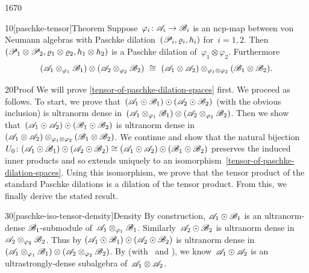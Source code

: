 \begin{parsec}{1670}%
\begin{point}{10}[paschke-tensor]{Theorem}%
Suppose~$\varphi_i \colon \mathscr{A}_i \to \mathscr{B}_i$
    is an ncp-map between von Neumann algebras
    with Paschke dilation~$(\mathscr{P}_i, \varrho_i, h_i)$
    for~$i=1,2$.
Then~$(\mathscr{P}_1 \otimes \mathscr{P}_2, \varrho_1 \otimes \varrho_2, h_1\otimes h_2)$
    is a Paschke dilation of~$\varphi_1 \otimes \varphi_2$.
    Furthermore
\begin{equation}\label{tensor-of-paschke-dilation-spaces}
(\scrA_1 \otimes_{\varphi_1} \scrB_1)
\otimes (\scrA_2 \otimes_{\varphi_2} \scrB_2)
\ \cong \ 
(\scrA_1 \otimes \scrA_2) \otimes_{\varphi_1\otimes \varphi_2} (\scrB_1 \otimes \scrB_2).
\end{equation}
\spacingfix{}
\begin{point}{20}{Proof}%
We will prove \eqref{tensor-of-paschke-dilation-spaces} first.
We proceed as follows.
To start, we prove that~$
(\mathscr{A}_1 \odot \mathscr{B}_1) \odot (\mathscr{A}_2 \odot \mathscr{B}_2)$
    (with the obvious inclusion)
    is ultranorm dense in~$(\mathscr{A}_1 \otimes_{\varphi_1} \mathscr{B}_1)
\otimes (\mathscr{A}_2 \otimes_{\varphi_2} \mathscr{B}_2)$.
Then we show that~$
(\mathscr{A}_1 \odot \mathscr{A}_2) \odot (\mathscr{B}_1 \odot \mathscr{B}_2) $
is ultranorm dense in~$
(\mathscr{A}_1 \otimes \mathscr{A}_2) \otimes_{\varphi_1\otimes \varphi_2} (\mathscr{B}_1 \otimes \mathscr{B}_2)$.
We continue and show that the natural bijection
$U_0\colon (\mathscr{A}_1 \odot \mathscr{B}_1) \odot (\mathscr{A}_2 \odot \mathscr{B}_2) \cong
(\mathscr{A}_1 \odot \mathscr{A}_2) \odot (\mathscr{B}_1 \odot \mathscr{B}_2) $
preserves the induced inner products and
    so extends uniquely to an
    isomorphism~\eqref{tensor-of-paschke-dilation-spaces}.
Using this isomorphism,
    we prove that the tensor product of the standard Paschke dilations
    is a dilation of the tensor product.
    From this, we finally derive the stated result.
\begin{point}{30}[paschke-iso-tensor-density]{Density}%
By construction, $\mathscr{A}_1 \odot \mathscr{B}_1$ is an ultranorm-dense
        $\mathscr{B}_1$-submodule
    of~$\mathscr{A}_1 \otimes_{\varphi_1} \mathscr{B}_1$.
Similarly~$\mathscr{A}_2 \odot \mathscr{B}_2 $ is ultranorm dense
    in~$\mathscr{A}_2 \otimes_{\varphi_2} \mathscr{B}_2$.
Thus by 
    $(\mathscr{A}_1 \odot \mathscr{B}_1) \odot(
    \mathscr{A}_2 \odot \mathscr{B}_2) $ is ultranorm dense in~$(\mathscr{A}_1 \otimes_{\varphi_1} \mathscr{B}_1)
\otimes (\mathscr{A}_2 \otimes_{\varphi_2} \mathscr{B}_2)$.
By 
        (with~ and ),
    we know~$\mathscr{A}_1 \odot \mathscr{A}_2$
    is an ultrastrongly-dense subalgebra
    of~$\mathscr{A}_1 \otimes \mathscr{A}_2$.

\end{point}
\end{point}
\end{point}
\end{parsec}
